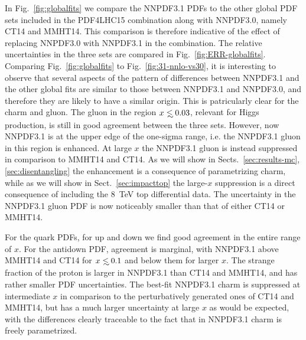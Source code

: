 In Fig.~\ref{fig:globalfits} we compare the NNPDF3.1 PDFs to the other
global PDF sets included in the PDF4LHC15 combination along with NNPDF3.0, 
namely CT14 and MMHT14. This comparison is therefore indicative of the effect of
replacing NNPDF3.0 with NNPDF3.1 in the combination. 
The relative 
uncertainties in the three sets are compared in
Fig.~\ref{fig:ERR-globalfits}. Comparing Fig.~\ref{fig:globalfits} to
Fig.~\ref{fig:31-nnlo-vs30},  it is interesting to observe that  
several aspects of the pattern
of differences between NNPDF3.1 and the other global fits
are  similar to those between NNPDF3.1  and NNPDF3.0, and therefore
they are likely to have a similar origin. This is patricularly clear
for the charm and gluon.
The gluon in the region $x\lsim 0.03$, relevant for Higgs
production, is still in good 
    agreement between the three sets. However, now NNPDF3.1 is at the upper edge
    of the one-sigma range, i.e. the  NNPDF3.1 gluon
    in this region is enhanced.
    At large $x$ the NNPDF3.1 gluon is instead suppressed in comparison to
    MMHT14 and CT14. As we will show in Sects.~\ref{sec:results-mc}, \ref{sec:disentangling}
    the  enhancement is a consequence of parametrizing charm, while
    as we will show in 
    Sect.~\ref{sec:impacttop} the large-$x$ suppression is a direct
    consequence of including the 8~TeV top differential data. 
    The uncertainty in the NNPDF3.1 gluon PDF is now 
   noticeably smaller than that of either CT14 or MMHT14. 

For the quark PDFs, for up and down we find 
good agreement in the entire range of $x$. For the antidown PDF,
agreement is marginal, 
with NNPDF3.1 above MMHT14 and CT14 for $x\lsim 0.1$ and below them for larger
$x$. The strange fraction of the proton is larger in NNPDF3.1 than CT14 and 
MMHT14, and has rather smaller PDF uncertainties.
The best-fit NNPDF3.1 charm is suppressed at intermediate $x$ in comparison to the
perturbatively generated ones of CT14 and MMHT14, but has a much larger
uncertainty at large $x$ as would be expected, with the differences
clearly traceable  to the fact that in
   NNPDF3.1 charm  is freely parametrized.

